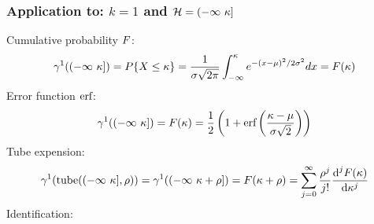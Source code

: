 \documentclass[12pt]{article}
\begin{document}
\subsubsection{Application to: $k=1$ and $\mathcal{H}=(-\infty\ \kappa]$}
Cumulative probability $F$:
\begin{equation}
  \gamma^1((-\infty\ \kappa]) = P\{X\le\kappa\}=\frac{1}{\sigma\sqrt{2\pi}} \int_{-\infty}^\kappa e^{-(x-\mu)^2/2\sigma^2} dx=F(\kappa)
\end{equation}
Error function $\text{erf}$:
\begin{equation}
  \gamma^1((-\infty\ \kappa])=F(\kappa)=\frac{1}{2}\left(1+\text{erf}\left(\frac{\kappa-\mu}{\sigma\sqrt{2}}\right)\right)
\end{equation}
Tube expension:
\begin{equation}
  \GaussMeas^1(\tube(\minfu,\ray))=\GaussMeas^1((-\infty\ \lset+\ray])=\CDP(\lset+\ray)=\sum_{j=0}^{\infty} \frac{\ray^j}{j!} \frac{\text{d}^j \CDP(\lset)}{\text{d} \lset^j}
\end{equation}
Identification:
\end{document}
